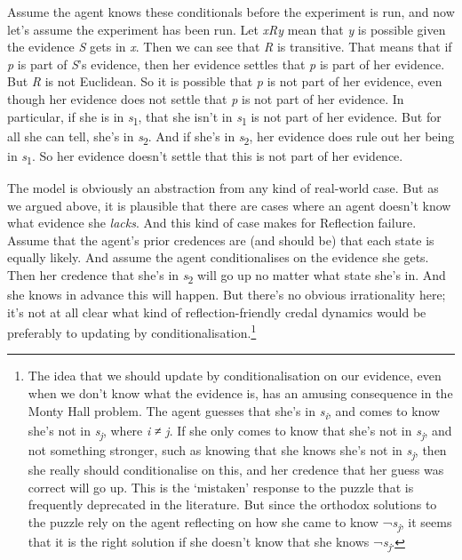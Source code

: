 \documentclass[
  10pt,
  letterpaper,
  DIV=11,
  numbers=noendperiod,
  twoside]{scrartcl}
\begin{document}
Assume the agent knows these conditionals before the experiment is run,
and now let's assume the experiment has been run. Let \emph{xRy} mean
that \emph{y} is possible given the evidence \emph{S} gets in \emph{x}.
Then we can see that \emph{R} is transitive. That means that if \emph{p}
is part of \emph{S}'s evidence, then her evidence settles that \emph{p}
is part of her evidence. But \emph{R} is not Euclidean. So it is
possible that \emph{p} is not part of her evidence, even though her
evidence does not settle that \emph{p} is not part of her evidence. In
particular, if she is in \emph{s}\textsubscript{1}, that she isn't in
\emph{s}\textsubscript{1} is not part of her evidence. But for all she
can tell, she's in \emph{s}\textsubscript{2}. And if she's in
\emph{s}\textsubscript{2}, her evidence does rule out her being in
\emph{s}\textsubscript{1}. So her evidence doesn't settle that this is
not part of her evidence.

The model is obviously an abstraction from any kind of real-world case.
But as we argued above, it is plausible that there are cases where an
agent doesn't know what evidence she \emph{lacks}. And this kind of case
makes for Reflection failure. Assume that the agent's prior credences
are (and should be) that each state is equally likely. And assume the
agent conditionalises on the evidence she gets. Then her credence that
she's in \emph{s}\textsubscript{2} will go up no matter what state she's
in. And she knows in advance this will happen. But there's no obvious
irrationality here; it's not at all clear what kind of
reflection-friendly credal dynamics would be preferably to updating by
conditionalisation.\footnote{The idea that we should update by
  conditionalisation on our evidence, even when we don't know what the
  evidence is, has an amusing consequence in the Monty Hall problem. The
  agent guesses that she's in \emph{s\textsubscript{i}}, and comes to
  know she's not in \emph{s\textsubscript{j}}, where \emph{i} ≠
  \emph{j}. If she only comes to know that she's not in
  \emph{s\textsubscript{j}}, and not something stronger, such as knowing
  that she knows she's not in \emph{s\textsubscript{j}}, then she really
  should conditionalise on this, and her credence that her guess was
  correct will go up. This is the `mistaken' response to the puzzle that
  is frequently deprecated in the literature. But since the orthodox
  solutions to the puzzle rely on the agent reflecting on how she came
  to know ¬\emph{s\textsubscript{j}}, it seems that it is the right
  solution if she doesn't know that she knows
  ¬\emph{s\textsubscript{j}}.}
\end{document}
